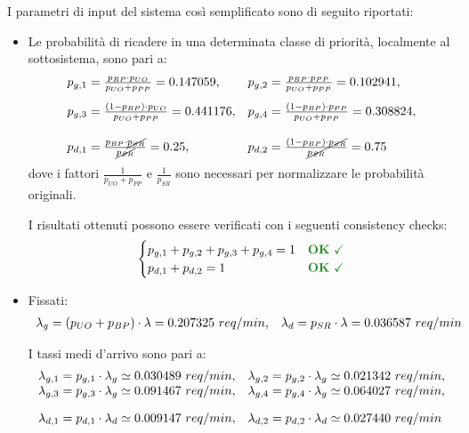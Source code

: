 I parametri di input del sistema così semplificato sono di seguito riportati:
\begin{itemize}
\item Le probabilità di ricadere in una determinata classe di priorità, localmente al sottosistema, sono pari a:
\begin{equation}
\begin{array}{l l}
p_{g,1} = \frac{p_{BP} \cdot p_{UO}}{p_{UO} + p_{PP}} = 0.147059, & p_{g,2} = \frac{p_{BP} \cdot p_{PP}}{p_{UO} + p_{PP}} = 0.102941, \\[1em]
p_{g,3} = \frac{(1-p_{BP}) \cdot p_{UO}}{p_{UO} + p_{PP}} = 0.441176, & p_{g,4} = \frac{(1-p_{BP}) \cdot p_{PP}}{p_{UO} + p_{PP}} = 0.308824, \\[1.5em]
p_{d,1} = \frac{p_{BP} \cdot \cancel{p_{SR}}}{\cancel{p_{SR}}} = 0.25, & p_{d,2} = \frac{(1-p_{BP}) \cdot \cancel{p_{SR}}}{\cancel{p_{SR}}} = 0.75
\end{array}
\end{equation}
dove i fattori $\frac{1}{p_{UO} + p_{PP}}$ e $\frac{1}{p_{SR}}$ sono necessari per normalizzare le probabilità originali.

I risultati ottenuti possono essere verificati con i seguenti consistency checks:
\begin{equation}
\begin{cases}
p_{g,1} + p_{g,2} + p_{g,3} + p_{g,4} = 1 & \text{\color{forestgreen}\textbf{OK} \checkmark} \\
p_{d,1} + p_{d,2}  = 1 & \text{\color{forestgreen}\textbf{OK} \checkmark}
\end{cases}
\end{equation}
\item Fissati:
\begin{equation}
\begin{array}{l l}
\lambda_g = (p_{UO} + p_{BP})\cdot \lambda = 0.207325\ req/min, & \lambda_d = p_{SR}\cdot \lambda = 0.036587\ req/min
\end{array}
\end{equation} 

I tassi medi d'arrivo sono pari a:
\begin{equation}
\begin{array}{l l}
\lambda_{g,1} = p_{g,1} \cdot \lambda_g \simeq 0.030489\ req/min, & \lambda_{g,2} = p_{g,2} \cdot \lambda_g \simeq 0.021342\ req/min, \\
\lambda_{g,3} = p_{g,3} \cdot \lambda_g \simeq 0.091467\ req/min, & \lambda_{g,4} = p_{g,4} \cdot \lambda_g \simeq 0.064027\ req/min, \\[1em]
\lambda_{d,1} = p_{d,1} \cdot \lambda_d \simeq 0.009147\ req/min, & \lambda_{d,2} = p_{d,2} \cdot \lambda_d \simeq 0.027440\ req/min \\
\end{array}
\end{equation}


\end{itemize}
